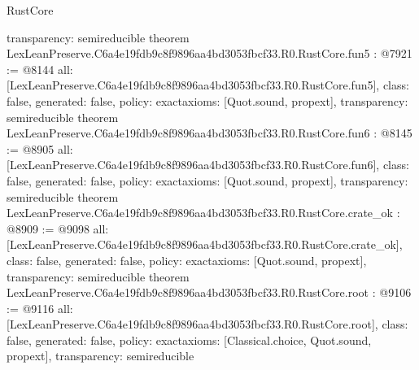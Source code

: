 \begin{lexlean}{RustCore}
\begin{coremodule}
{  transparency: semireducible
}
theorem LexLeanPreserve.C6a4e19fdb9c8f9896aa4bd3053fbcf33.R0.RustCore.fun5 : @7921 := @8144 {
  all: [LexLeanPreserve.C6a4e19fdb9c8f9896aa4bd3053fbcf33.R0.RustCore.fun5],
  class: false,
  generated: false,
  policy: exact{axioms: [Quot.sound, propext]},
  transparency: semireducible
}
theorem LexLeanPreserve.C6a4e19fdb9c8f9896aa4bd3053fbcf33.R0.RustCore.fun6 : @8145 := @8905 {
  all: [LexLeanPreserve.C6a4e19fdb9c8f9896aa4bd3053fbcf33.R0.RustCore.fun6],
  class: false,
  generated: false,
  policy: exact{axioms: [Quot.sound, propext]},
  transparency: semireducible
}
theorem LexLeanPreserve.C6a4e19fdb9c8f9896aa4bd3053fbcf33.R0.RustCore.crate_ok : @8909 := @9098 {
  all: [LexLeanPreserve.C6a4e19fdb9c8f9896aa4bd3053fbcf33.R0.RustCore.crate_ok],
  class: false,
  generated: false,
  policy: exact{axioms: [Quot.sound, propext]},
  transparency: semireducible
}
theorem LexLeanPreserve.C6a4e19fdb9c8f9896aa4bd3053fbcf33.R0.RustCore.root : @9106 := @9116 {
  all: [LexLeanPreserve.C6a4e19fdb9c8f9896aa4bd3053fbcf33.R0.RustCore.root],
  class: false,
  generated: false,
  policy: exact{axioms: [Classical.choice, Quot.sound, propext]},
  transparency: semireducible
}


\end{coremodule}
\end{lexlean}
